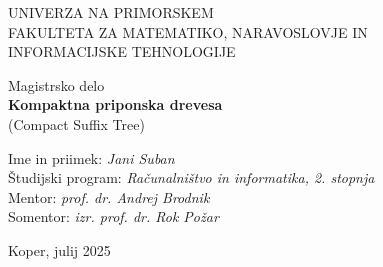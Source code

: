 \documentclass[12pt,a4paper,titlepage,openany,twoside]{report}
\begin{document}
\pagestyle{empty}
\begin{center}
\noindent \large UNIVERZA NA PRIMORSKEM\\
\large FAKULTETA ZA MATEMATIKO, NARAVOSLOVJE IN\\
INFORMACIJSKE TEHNOLOGIJE


\normalsize
\vspace{6cm}
Magistrsko delo\\
\textbf{\large Kompaktna priponska drevesa}\\ %
\normalsize
(Compact Suffix Tree)\\ %
\end{center}

\begin{flushleft}
\vspace{5cm}
\noindent Ime in priimek: \textit{Jani Suban}
\\
\noindent Študijski program: \textit{Računalništvo in informatika, 2. stopnja}
\\
\noindent Mentor: \textit{prof. dr. Andrej Brodnik}
\\
\noindent Somentor: \textit{izr. prof. dr. Rok Požar}
\\

\end{flushleft}

\vspace{4cm}
\begin{center}
\large {Koper, julij 2025} %
\end{center}
\newpage

\pagestyle{fancy}
\end{document}
